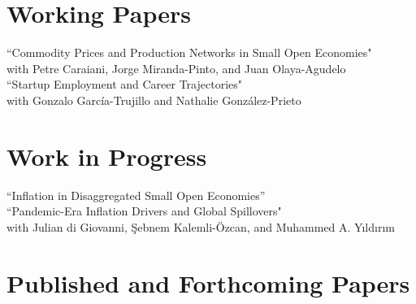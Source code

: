 \documentclass[10pt]{article}
\begin{document}
\section*{Working Papers}

    ``Commodity Prices and Production Networks in Small Open Economies"\\
        \indent with Petre Caraiani, Jorge Miranda-Pinto, and Juan Olaya-Agudelo\\[-0.125in]

\noindent ``Startup Employment and Career Trajectories"\\
\indent with Gonzalo Garc\'ia-Trujillo and Nathalie Gonz\'alez-Prieto



\section*{Work in Progress}

``Inflation in Disaggregated Small Open Economies''\\[-0.125in]

\noindent ``Pandemic-Era Inflation Drivers and Global Spillovers"\\
\indent with Julian di Giovanni, \c{S}ebnem Kalemli-\"{O}zcan, and Muhammed A. Y{\i}ld{\i}r{\i}m




\section*{Published and Forthcoming Papers}
\iffalse
\begin{enumerate}[wide, labelwidth=!,labelindent=5pt]
    \item Business Cycle Asymmetry and Input-Output Structure: The Role of Firm-to-Firm Networks (2023), with Jorge Miranda-Pinto and Eric R. Young, accepted, \emph{\bfseries Journal of Monetary Economics}.
    \item Quantifying the Inflationary Impact of Fiscal Stimulus Under Supply Constraints (2023), with Julian di Giovanni, \c{S}ebnem Kalemli-\"{O}zcan, and Muhammed A. Y{\i}ld{\i}r{\i}m, Forthcoming, \emph{\bfseries American Economic Association, Papers \& Proceedings}.
    \item Global Supply Chain Pressures, International Trade and Inflation (2022), with Julian di Giovanni, \c{S}ebnem Kalemli-\"{O}zcan, and Muhammed A. Y{\i}ld{\i}r{\i}m,  \textit{\bfseries Conference Proceedings ECB Forum: ``Challenges for Monetary Policy in a Rapidly Changing World''}
    \item Price Controls, Hyperinflation, and the Inflation-Relative Price Variability Relationship (2021), with Rodrigo Cerda and Rolf L\"{u}ders,  \textbf{\textit{Empirical Economics}}, \emph{61}(4), pp. 1725--1748.
\end{enumerate}
\fi
\end{document}
